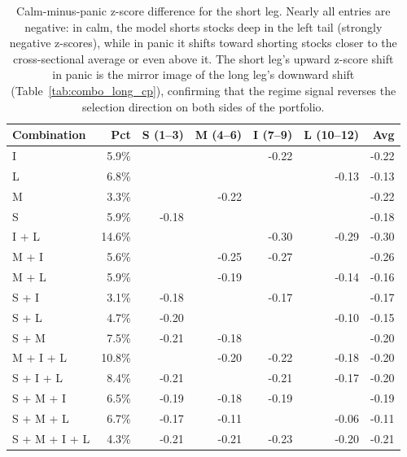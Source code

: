 \begin{table}[H]
\centering
\small
\begin{tabular}{l r r r r r r}
\toprule
Combination & Pct & S (1--3) & M (4--6) & I (7--9) & L (10--12) & Avg \\
\midrule
I & 5.9\% &  &  & -0.22 &  & -0.22 \\
L & 6.8\% &  &  &  & -0.13 & -0.13 \\
M & 3.3\% &  & -0.22 &  &  & -0.22 \\
S & 5.9\% & -0.18 &  &  &  & -0.18 \\
I {+} L & 14.6\% &  &  & -0.30 & -0.29 & -0.30 \\
M {+} I & 5.6\% &  & -0.25 & -0.27 &  & -0.26 \\
M {+} L & 5.9\% &  & -0.19 &  & -0.14 & -0.16 \\
S {+} I & 3.1\% & -0.18 &  & -0.17 &  & -0.17 \\
S {+} L & 4.7\% & -0.20 &  &  & -0.10 & -0.15 \\
S {+} M & 7.5\% & -0.21 & -0.18 &  &  & -0.20 \\
M {+} I {+} L & 10.8\% &  & -0.20 & -0.22 & -0.18 & -0.20 \\
S {+} I {+} L & 8.4\% & -0.21 &  & -0.21 & -0.17 & -0.20 \\
S {+} M {+} I & 6.5\% & -0.19 & -0.18 & -0.19 &  & -0.19 \\
S {+} M {+} L & 6.7\% & -0.17 & -0.11 &  & -0.06 & -0.11 \\
S {+} M {+} I {+} L & 4.3\% & -0.21 & -0.21 & -0.23 & -0.20 & -0.21 \\
\bottomrule
\end{tabular}
\caption{Calm-minus-panic z-score difference for the short leg. Nearly all entries are negative: in calm, the model shorts stocks deep in the left tail (strongly negative z-scores), while in panic it shifts toward shorting stocks closer to the cross-sectional average or even above it. The short leg's upward z-score shift in panic is the mirror image of the long leg's downward shift (Table~\ref{tab:combo_long_cp}), confirming that the regime signal reverses the selection direction on both sides of the portfolio.}
\label{tab:combo_short_cp}
\end{table}
